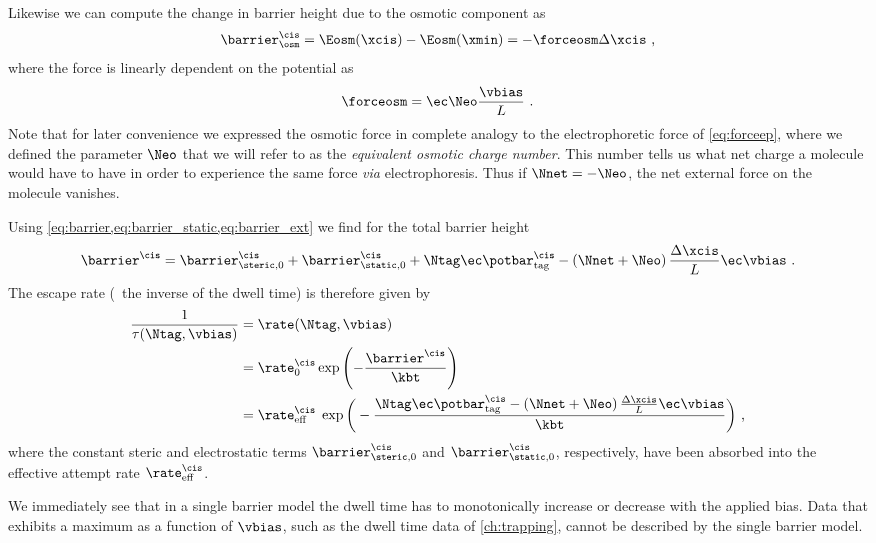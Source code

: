 Likewise we can compute the change in barrier height due to the osmotic component as
%
\begin{align*}
    \barrier^\cis_{\osm} = \Eosm(\xcis) - \Eosm(\xmin)
    = - \forceosm \Delta \xcis
    \text{ ,}
\end{align*}
%
where the force is linearly dependent on the potential as
%
\begin{align}\label{eq:osmoticforce}
    \forceosm = \ec \Neo \frac{\vbias}{L}
    \text{ .}
\end{align}
%
Note that for later convenience we expressed the osmotic force in complete analogy to the electrophoretic
force of \cref{eq:forceep}, where we defined the parameter $\Neo$ that we will refer to as the
\emph{equivalent osmotic charge number}. This number tells us what net charge a molecule would have to have in
order to experience the same force \textit{via} electrophoresis. Thus if $\Nnet = -\Neo$, the net external
force on the molecule vanishes.

Using \cref{eq:barrier,eq:barrier_static,eq:barrier_ext} we find for the total barrier height
%
\begin{align}\label{eq:cisbarrier}
    \barrier^\cis = \barrier^{\cis}_{\steric,0} + \barrier^{\cis}_{\static,0}
        + \Ntag \ec  \potbar_{\rm{tag}}^\cis
        - \left(\Nnet + \Neo\right) \frac{\Delta \xcis}{L}\ec \vbias
    \text{ .}
\end{align}
%
The escape rate (\ie~the inverse of the dwell time) is therefore given by
%
\begin{align}\label{eq:single_barrier_dwell_time}
\begin{split}
    \frac{1}{\tau(\Ntag, \vbias)} ={}& \rate (\Ntag, \vbias)\\
    ={}& \rate^{\cis}_0 \exp\left(-\frac{\barrier^\cis}{\kbt}\right)\\
    ={}& \rate^{\cis}_{\rm{eff}}\; \exp\bigg(
        - \frac{\Ntag \ec  \potbar_{\rm{tag}}^\cis
        - \left(\Nnet + \Neo\right) \frac{\Delta \xcis}{L}\ec \vbias}{\kbt}
    \bigg)
    \text{ ,}
\end{split}
\end{align}
%
where the constant steric and electrostatic terms $\barrier^{\cis}_{\steric,0}$ and
$\barrier^{\cis}_{\static,0}$, respectively, have been absorbed into the effective attempt rate
$\rate^{\cis}_{\rm{eff}}$.

We immediately see that in a single barrier model the dwell time has to monotonically increase or decrease
with the applied bias.  Data that exhibits a maximum as a function of $\vbias$, such as the dwell time data of
\cref{ch:trapping}, cannot be described by the single barrier model.


